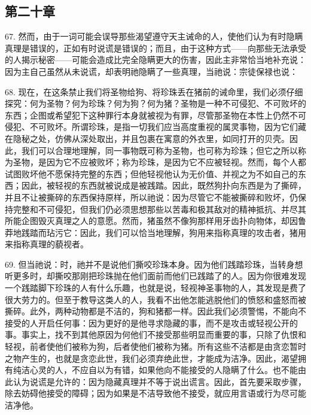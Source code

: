 
\subsection{第二十章}

67. 然而，由于一词可能会误导那些渴望遵守天主诫命的人，使他们认为有时隐瞒真理是错误的，正如有时说谎是错误的；而且，由于这种方式——向那些无法承受的人揭示秘密——可能会造成比完全隐瞒更大的伤害，因此主非常恰当地补充说：因为主自己虽然从未说谎，却表明祂隐瞒了一些真理，当祂说：宗徒保禄也说：\par

68. 现在，在这条禁止我们将圣物给狗、将珍珠丢在猪前的诫命里，我们必须仔细探究：何为圣物？何为珍珠？何为狗？何为猪？圣物是一种不可侵犯、不可败坏的东西；企图或希望犯下这种罪行本身就被视为有罪，尽管那圣物在本性上仍然不可侵犯、不可败坏。所谓珍珠，是指一切我们应当高度重视的属灵事物，因为它们藏在隐秘之处，仿佛从深处取出，并且包裹在寓意的外衣里，如同打开的贝壳。因此，我们可以合理地理解，同一事物既可称为圣物，也可称为珍珠；但它之所以称为圣物，是因为它不应被败坏；称为珍珠，是因为它不应被轻视。然而，每个人都试图败坏他不愿保持完整的东西；但他轻视他认为无价值、并视之为不如自己的东西；因此，被轻视的东西就被说成是被践踏。因此，既然狗扑向东西是为了撕碎，并且不让被撕碎的东西保持原样，所以祂说：因为尽管它不能被撕碎和败坏，仍保持完整和不可侵犯，但我们仍必须思想那些以苦毒和极其敌对的精神抵抗、并尽其所能企图毁灭真理之人的意愿。然而，猪虽然不像狗那样用牙齿扑向物体，却因鲁莽地践踏而玷污它：因此，我们可以恰当地理解，狗用来指称真理的攻击者，猪用来指称真理的藐视者。\par

69. 但当祂说：时，祂并不是说他们撕咬珍珠本身。因为他们践踏珍珠，当转身想听更多时，却撕咬那刚把珍珠抛在他们面前而他们已践踏了的人。因为你很难发现一个践踏脚下珍珠的人有什么乐趣，也就是说，轻视神圣事物的人，其发现是费了很大劳力的。但至于教导这类人的人，我看不出他怎能逃脱他们的愤怒和盛怒而被撕碎。此外，两种动物都是不洁的，狗和猪都一样。因此我们必须警惕，不能向不接受的人开启任何事：因为更好的是他寻求隐藏的事，而不是攻击或轻视公开的事。事实上，找不到其他原因为何他们不接受那些明显而重要的事，只除了仇恨和轻视，前者使他们被称为狗，后者使他们被称为猪。所有这些不洁都是由贪恋暂时之物产生的，也就是贪恋此世，我们必须弃绝此世，才能成为洁净。因此，渴望拥有纯洁心灵的人，不应自以为有错，如果他向不能接受的人隐瞒了什么。也不能由此认为说谎是允许的：因为隐藏真理并不等于说出谎言。因此，首先要采取步骤，除去妨碍他接受的障碍；因为如果是不洁导致他不接受，就应用言语或行为尽可能洁净他。\par


